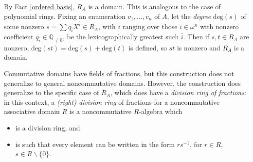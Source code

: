 \documentclass{amsart}
\theoremstyle{definition}
\theoremstyle{remark}
\numberwithin{equation}{section}
\begin{document}
By Fact \ref{ordered basis}, $R_{A}$ is a domain. This is analogous to the case of polynomial rings. Fixing an enumeration $v_{1}, \ldots, v_{n}$ of $A$, let the \textit{degree} $\mathrm{deg}(s)$ of some nonzero $s=\sum q_{\bar{i}} X^{\bar{i}} \in R_{A}$, with $\bar{i}$ ranging over those $\bar{i} \in \omega^{n}$ with nonzero coefficient $q_{\bar{i}} \in \mathbb{Q}_{\neq 0}$, be the lexicographically greatest such $\bar{i}$. Then if $s, t \in R_{A}$ are nonzero, $\mathrm{deg}(st)=\mathrm{deg}(s) + \mathrm{deg}(t)$ is defined, so $st$ is nonzero and $R_{A}$ is a domain.

Commutative domains have fields of fractions, but this construction does not generalize to general noncommutative domains. However, the construction does generalize to the specific case of $R_{A}$, which does have a \textit{division ring of fractions}: in this context, a \textit{(right) division ring} of fractions for a noncommutative associative domain $R$ is a noncommutative $R$-algebra which

\begin{itemize}
    \item is a division ring, and
    \item is such that every element can be written in the form $rs^{-1}$, for $r \in R$, $s \in R \backslash \{0\}$.
\end{itemize}
\end{document}
